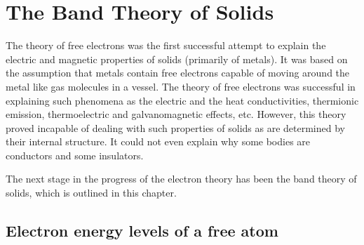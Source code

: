 

\chapter[The Band Theory of Solids]{The Band Theory of Solids}\label{chap:5}

The theory of free electrons was the first successful attempt to explain the electric and magnetic properties of solids (primarily of metals). It was based on the assumption that metals contain free electrons capable of moving around the metal like gas molecules in a vessel. The theory of free electrons was successful in explaining such phenomena as the electric and the heat conductivities, thermionic emission, thermoelectric and galvanomagnetic effects, etc. However, this theory proved incapable of dealing with such properties of solids as are determined by their internal structure. It could not even explain why some bodies are conductors and some insulators.

The next stage in the progress of the electron theory has been the band theory of solids, which is outlined in this chapter.

\section{Electron energy levels of a free atom}\label{sec:37}



